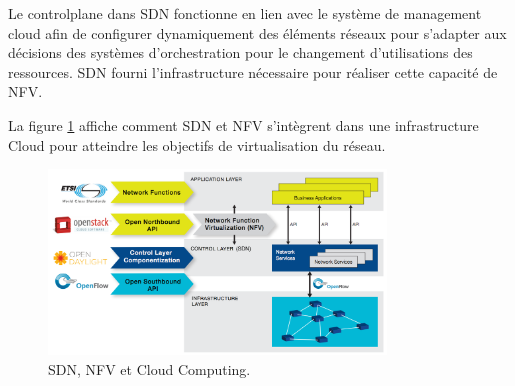 
Le \gls{controlplane} dans SDN fonctionne en lien avec le système de management cloud afin de configurer dynamiquement des éléments réseaux pour s'adapter aux décisions des systèmes d'orchestration pour le changement d'utilisations des ressources. SDN fourni l'infrastructure nécessaire pour réaliser cette capacité de NFV.

La figure \ref{cloud-sdn-nfv} affiche comment SDN et NFV s'intègrent dans une infrastructure Cloud pour atteindre les objectifs de virtualisation du réseau. \\

\begin{figure}[h]
\begin{center}
\includegraphics[width=0.8\textwidth]{images/cloud-sdn-nfv} 
\caption{SDN, NFV et Cloud Computing. \cite{leveragingSDNCloudNetworkServiceExample}} \label{cloud-sdn-nfv}
\end{center}
\end{figure} 

